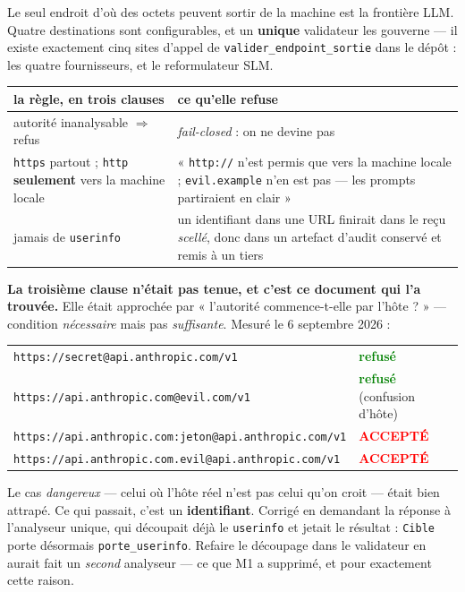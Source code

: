 \documentclass[10pt]{report}
\newcommand{\code}[1]{\texttt{\small #1}}
\newcommand{\ok}[1]{\textcolor{green}{\textbf{#1}}}
\newcommand{\ko}[1]{\textcolor{red}{\textbf{#1}}}
\begin{document}
Le seul endroit d'où des octets peuvent sortir de la machine est la frontière LLM. Quatre
destinations sont configurables, et un \textbf{unique} validateur les gouverne --- il existe
exactement cinq sites d'appel de \code{valider\_endpoint\_sortie} dans le dépôt : les quatre
fournisseurs, et le reformulateur SLM.

\begin{longtable}{@{}p{6.0cm} p{9.0cm}@{}}
\toprule \textbf{la règle, en trois clauses} & \textbf{ce qu'elle refuse} \\ \midrule \endhead
autorité inanalysable $\Rightarrow$ refus & \emph{fail-closed} : on ne devine pas \\
\code{https} partout ; \code{http} \textbf{seulement} vers la machine locale & « \code{http://} n'est permis que vers la machine locale ; \code{evil.example} n'en est pas --- les prompts partiraient en clair » \\
jamais de \code{userinfo} & un identifiant dans une URL finirait dans le reçu \emph{scellé}, donc dans un artefact d'audit conservé et remis à un tiers \\
\bottomrule
\end{longtable}

\begin{alerte}
\textbf{La troisième clause n'était pas tenue, et c'est ce document qui l'a trouvée.} Elle était
approchée par « l'autorité commence-t-elle par l'hôte ? » --- condition \emph{nécessaire} mais pas
\emph{suffisante}. Mesuré le 6 septembre 2026 :

\medskip
\begin{tabular}{@{}p{9.4cm}l@{}}
\code{https://secret@api.anthropic.com/v1} & \ok{refusé} \\
\code{https://api.anthropic.com@evil.com/v1} & \ok{refusé} (confusion d'hôte) \\
\code{https://api.anthropic.com:jeton@api.anthropic.com/v1} & \ko{ACCEPTÉ} \\
\code{https://api.anthropic.com.evil@api.anthropic.com/v1} & \ko{ACCEPTÉ} \\
\end{tabular}

\medskip
Le cas \emph{dangereux} --- celui où l'hôte réel n'est pas celui qu'on croit --- était bien attrapé.
Ce qui passait, c'est un \textbf{identifiant}. Corrigé en demandant la réponse à l'analyseur
unique, qui découpait déjà le \code{userinfo} et jetait le résultat : \code{Cible} porte désormais
\code{porte\_userinfo}. Refaire le découpage dans le validateur en aurait fait un \emph{second}
analyseur --- ce que M1 a supprimé, et pour exactement cette raison.
\end{alerte}
\end{document}
